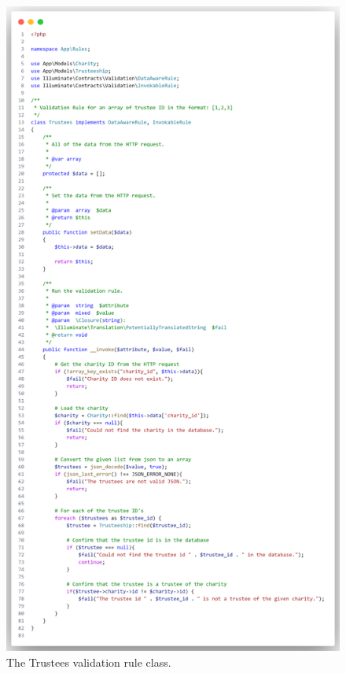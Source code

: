 \documentclass{UoYCSproject}
\begin{document}
\begin{figure}[H]
\begin{center}
\includegraphics[width=\textwidth]{"./assets/apendix/rules-code-screenshots/Trusteeship.png"}
\end{center}
\caption{The Trustees validation rule class.}
\end{figure}
\end{document}
